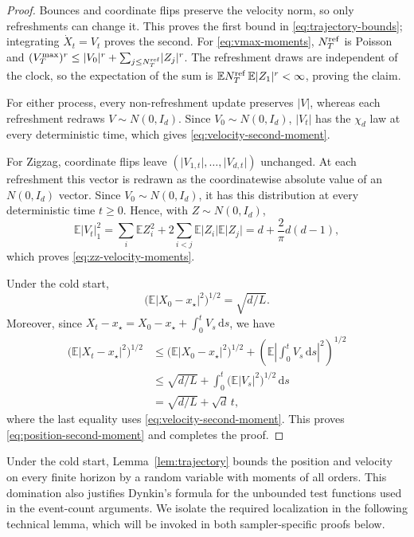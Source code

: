 \documentclass{amsart}
\theoremstyle{plain}
\theoremstyle{definition}
\theoremstyle{remark}
\newcommand{\ud}{\,\mathrm{d}}
\newcommand{\EE}{\mathbb{E}}
\newcommand{\abs}[1]{\lvert#1\rvert}
\newcommand{\E}{\EE}
\newcommand{\1}{\mathbf 1}
\newcommand{\dd}{\ud}
\begin{document}
\begin{proof}
Bounces and coordinate flips preserve the velocity norm, so only refreshments
can change it.  This proves the first bound in
\eqref{eq:trajectory-bounds}; integrating $\dot X_t=V_t$ proves the second.
For \eqref{eq:vmax-moments}, $N_T^{\rm ref}$ is Poisson and
$(V_T^{\max})^r\le\abs{V_0}^r+\sum_{j\le N_T^{\rm ref}}\abs{Z_j}^r$.
The refreshment draws are independent of the clock, so the expectation of the
sum is
$\E N_T^{\rm ref}\,\E\abs{Z_1}^r<\infty$, proving the claim.

For either process, every non-refreshment update preserves $\abs V$, whereas
each refreshment redraws $V\sim N(0,I_d)$.  Since $V_0\sim N(0,I_d)$,
$\abs{V_t}$ has the $\chi_d$ law at every deterministic time, which gives
\eqref{eq:velocity-second-moment}.

For Zigzag, coordinate flips leave
$(\abs{V_{1,t}},\ldots,\abs{V_{d,t}})$ unchanged.  At each refreshment this
vector is redrawn as the coordinatewise absolute value of an $N(0,I_d)$
vector.  Since $V_0\sim N(0,I_d)$, it has this distribution at every
deterministic time $t\ge0$.  Hence, with $Z\sim N(0,I_d)$,
\[
        \E\abs{V_t}_1^2
        =\sum_i\E Z_i^2+2\sum_{i<j}\E\abs{Z_i}\E\abs{Z_j}
        =d+\frac{2}{\pi}d(d-1),
\]
which proves \eqref{eq:zz-velocity-moments}.

Under the cold start,
\[
        \bigl(\E\abs{X_0-x_\star}^2\bigr)^{1/2}=\sqrt{d/L}.
\]
Moreover, since
$X_t-x_\star=X_0-x_\star+\int_0^tV_s\dd s$, we have
\[
\begin{aligned}
        \bigl(\E\abs{X_t-x_\star}^2\bigr)^{1/2}
        &\le
        \bigl(\E\abs{X_0-x_\star}^2\bigr)^{1/2}
        +\left(\E\left|\int_0^tV_s\dd s\right|^2\right)^{1/2}\\
        &\le \sqrt{d/L}
        +\int_0^t\bigl(\E\abs{V_s}^2\bigr)^{1/2}\dd s\\
        &=\sqrt{d/L}+\sqrt d\,t,
\end{aligned}
\]
where the last equality uses \eqref{eq:velocity-second-moment}.  This proves
\eqref{eq:position-second-moment} and completes the proof.
\end{proof}

Under the cold start, Lemma~\ref{lem:trajectory} bounds the position and
velocity on every finite horizon by a random variable with moments of all
orders.  This domination also justifies Dynkin’s formula for the unbounded test functions used in the event-count arguments.  We isolate the
required localization in the following technical lemma, which will be invoked
in both sampler-specific proofs below.
\end{document}
